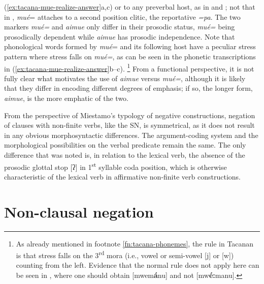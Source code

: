 \documentclass[output=paper]{langsci/langscibook}
\begin{document}
(\ref{ex:tacana-mue-realize-answer}a,c) or to any preverbal host, as in
 and ; not that in
, \textit{mué}= attaches to a second position clitic,
the reportative \textit{=pa}. The two markers \textit{mué=} and
\textit{aimue} only differ in their prosodic status, \textit{mué=} being
prosodically dependent while \textit{aimue} has prosodic independence. Note
that phonological words formed by \textit{mué}= and its following host have
a peculiar stress pattern where stress falls on \textit{mué=}, as can be
seen in the phonetic transcriptions in
(\ref{ex:tacana-mue-realize-answer}b--c).%
%
\footnote{As already mentioned in footnote \ref{fn:tacana-phonemes}, the rule in Tacanan is that
stress falls on the 3\textsuperscript{rd} mora (i.e., vowel or semi-vowel
[j] or [w]) counting from the left. Evidence that the normal rule does not
apply here can be seen in , where one should obtain [mwem\textbf{á}nu] and not [mw\textbf{é:}manu].} 
%
From a functional perspective, it is not fully clear what motivates the use
of \textit{aimue} versus \textit{mué=}, although it is likely that they
differ in encoding different degrees of emphasis; if so, the longer form, \textit{aimue}, is the more emphatic of the two.

From the perspective of Miestamo's \parencites*{Miestamo2005}{Miestamo2007}
typology of negative constructions, negation of clauses with non-finite
verbs, like the SN, is symmetrical, as it does not result in any obvious
morphosyntactic differences. The argument-coding system and the
morphological possibilities on the verbal predicate remain the same. The
only difference that was noted is, in relation to the lexical verb, the absence of the prosodic glottal stop [ʔ] in 1\textsuperscript{st} syllable coda position, which is otherwise characteristic of the lexical verb in affirmative non-finite verb constructions.

\section{Non-clausal negation}\label{sec:tacana-7}
\end{document}

